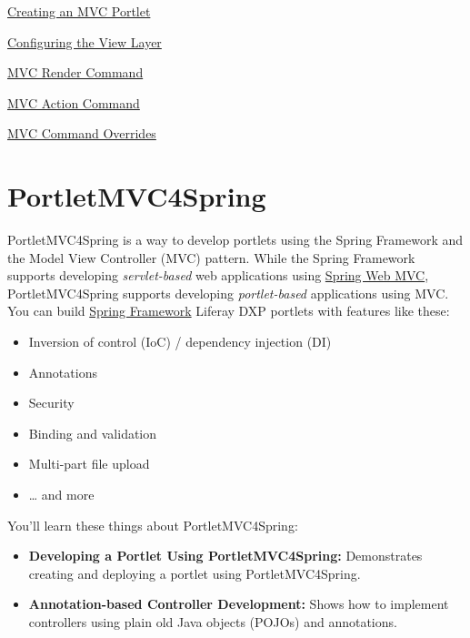 \href{/docs/7-2/appdev/-/knowledge_base/a/creating-an-mvc-portlet}{Creating
an MVC Portlet}

\href{/docs/7-2/appdev/-/knowledge_base/a/configuring-the-view-layer}{Configuring
the View Layer}

\href{/docs/7-2/appdev/-/knowledge_base/a/mvc-render-command}{MVC Render
Command}

\href{/docs/7-2/appdev/-/knowledge_base/a/mvc-action-command}{MVC Action
Command}

\href{/docs/7-2/customization/-/knowledge_base/c/overriding-liferay-mvc-commands}{MVC
Command Overrides}

\chapter{PortletMVC4Spring}\label{portletmvc4spring}

PortletMVC4Spring is a way to develop portlets using the Spring
Framework and the Model View Controller (MVC) pattern. While the Spring
Framework supports developing \emph{servlet-based} web applications
using
\href{https://docs.spring.io/spring/docs/current/spring-framework-reference/web.html}{Spring
Web MVC}, PortletMVC4Spring supports developing \emph{portlet-based}
applications using MVC. You can build
\href{https://spring.io/projects/spring-framework}{Spring Framework}
Liferay DXP portlets with features like these:

\begin{itemize}
\tightlist
\item
  Inversion of control (IoC) / dependency injection (DI)
\item
  Annotations
\item
  Security
\item
  Binding and validation
\item
  Multi-part file upload
\item
  \ldots{} and more
\end{itemize}

You'll learn these things about PortletMVC4Spring:

\begin{itemize}
\item
  \textbf{Developing a Portlet Using PortletMVC4Spring:} Demonstrates
  creating and deploying a portlet using PortletMVC4Spring.
\item
  \textbf{Annotation-based Controller Development:} Shows how to
  implement controllers using plain old Java objects (POJOs) and
  annotations.
\end{itemize}

